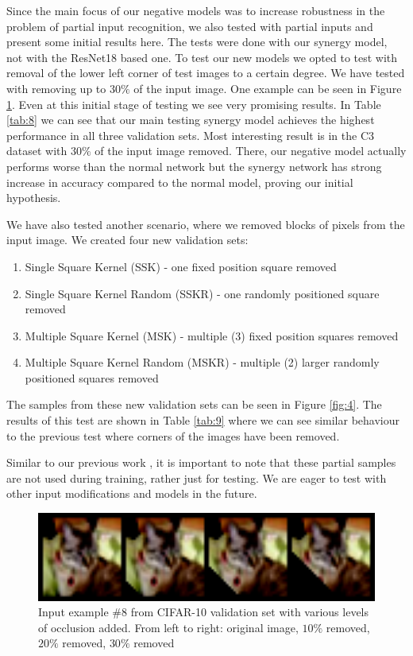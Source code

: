 \documentclass[b5paper]{book}
\let\cite\parencite
\begin{document}
Since the main focus of our negative models \cite{milovsevic2019classification} was to increase robustness in the problem of partial input recognition, we also tested with partial inputs and present some initial results here. The tests were done with our synergy model, not with the ResNet18 based one. To test our new models we opted to test with removal of the lower left corner of test images to a certain degree. We have tested with removing up to \( 30\% \) of the input image. One example can be seen in Figure \ref{fig:3}. Even at this initial stage of testing we see very promising results. In Table \ref{tab:8} we can see that our main testing synergy model achieves the highest performance in all three validation sets. Most interesting result is in the C3 dataset with \( 30\% \) of the input image removed. There, our negative model actually performs worse than the normal network but the synergy network has strong increase in accuracy compared to the normal model, proving our initial hypothesis.

We have also tested another scenario, where we removed blocks of pixels from the input image. We created four new validation sets:

\begin{enumerate}
    \item Single Square Kernel (SSK) - one fixed position square removed
    \item Single Square Kernel Random (SSKR) - one randomly positioned square removed
    \item Multiple Square Kernel (MSK) - multiple (3) fixed position squares removed
    \item Multiple Square Kernel Random (MSKR) - multiple (2) larger randomly positioned squares removed
\end{enumerate}

The samples from these new validation sets can be seen in Figure \ref{fig:4}. The results of this test are shown in Table \ref{tab:9} where we can see similar behaviour to the previous test where corners of the images have been removed.

Similar to our previous work \cite{milovsevic2019classification}, it is important to note that these partial samples are not used during training, rather just for testing. We are eager to test with other input modifications and models in the future.

\begin{figure}
    \centering
    \includegraphics[width=1\textwidth]{figures/fig3.png}
\caption{Input example \#8 from CIFAR-10 validation set with various levels of occlusion added. From left to right: original image, \( 10\% \) removed, \( 20\% \) removed, \( 30\% \) removed}
\label{fig:3} 
\end{figure}
\end{document}

